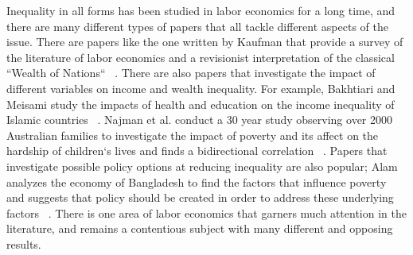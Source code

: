 \documentclass[11pt]{article}
\begin{document}
Inequality in all forms has been studied in labor economics for a long time,
and there are many different types of papers that all tackle different aspects
of the issue. There are papers like the one written by Kaufman that provide a
survey of the literature of labor economics and a revisionist interpretation of
the classical ``Wealth of Nations`` ~\cite{Kaufman-smith-paper}. There are also
papers that investigate the impact of different variables on income and wealth
inequality. For example, Bakhtiari and Meisami study the impacts of health and
education on the income inequality of Islamic countries ~\cite{Bakhtiari-islamic-paper}.
Najman et al. conduct a 30 year study observing over 2000 Australian families to
investigate the impact of poverty and its affect on the hardship of children`s
lives and finds a bidirectional correlation ~\cite{Najman-hardship-paper}.
Papers that investigate possible policy options at reducing inequality are
also popular;  Alam analyzes the economy of Bangladesh to find the factors
that influence poverty and suggests that policy should be created in order
to address these underlying factors ~\cite{Alam-poverty-paper}. There is one
 area of labor economics that garners much attention in the literature, and remains
 a contentious subject with many different and opposing results.
\end{document}
